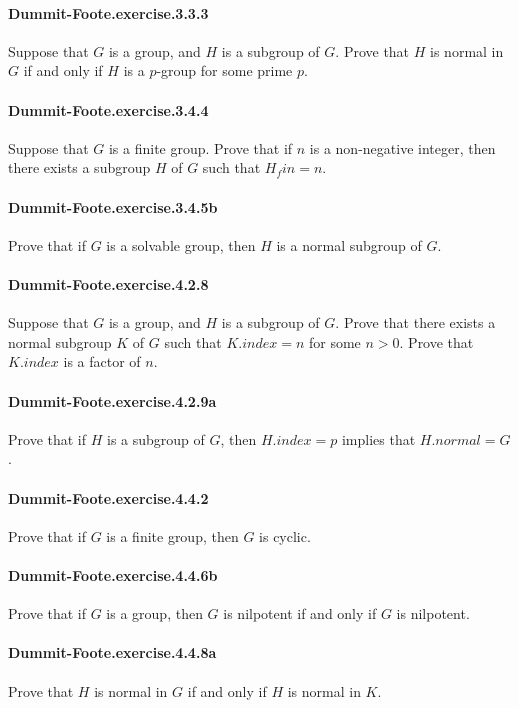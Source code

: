 \documentclass{article}
\begin{document}
\paragraph{Dummit-Foote.exercise.3.3.3} Suppose that $G$ is a group, and $H$ is a subgroup of $G$. Prove that $H$ is normal in $G$ if and only if $H$ is a $p$-group for some prime $p$.

\paragraph{Dummit-Foote.exercise.3.4.4} Suppose that $G$ is a finite group. Prove that if $n$ is a non-negative integer, then there exists a subgroup $H$ of $G$ such that $H_fin = n$.

\paragraph{Dummit-Foote.exercise.3.4.5b} Prove that if $G$ is a solvable group, then $H$ is a normal subgroup of $G$.

\paragraph{Dummit-Foote.exercise.4.2.8} Suppose that $G$ is a group, and $H$ is a subgroup of $G$. Prove that there exists a normal subgroup $K$ of $G$ such that $K.index = n$ for some $n > 0$. Prove that $K.index$ is a factor of $n$.

\paragraph{Dummit-Foote.exercise.4.2.9a} Prove that if $H$ is a subgroup of $G$, then $H.index = p$ implies that $H.normal = G$.

\paragraph{Dummit-Foote.exercise.4.4.2} Prove that if $G$ is a finite group, then $G$ is cyclic.

\paragraph{Dummit-Foote.exercise.4.4.6b} Prove that if $G$ is a group, then $G$ is nilpotent if and only if $G$ is nilpotent.

\paragraph{Dummit-Foote.exercise.4.4.8a} Prove that $H$ is normal in $G$ if and only if $H$ is normal in $K$.
\end{document}
